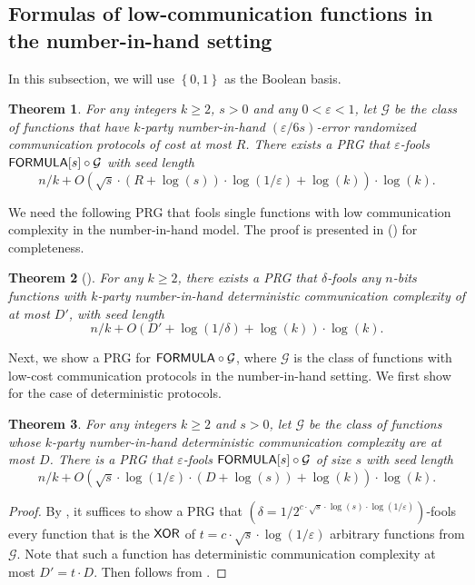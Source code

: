 \documentclass[10pt,a4paper]{article}
\newtheorem{theorem}{Theorem}
\newcommand{\bool}{\left\{0,1\right\}}
\newcommand{\FORMULA}{{\sf FORMULA}}
\newcommand{\XOR}{{\sf XOR}}
\begin{document}
    \subsection{Formulas of low-communication functions in the number-in-hand setting}
    
    In this subsection, we will use $\bool$ as the Boolean basis.
    
	\begin{theorem}\label{thm:prg-formula-lc}
		For any integers $k\geq 2$, $s>0$ and any $0<\varepsilon<1$, let $\mathcal{G}$ be the class of functions that have $k$-party number-in-hand $(\varepsilon/6s)$-error randomized communication protocols of cost at most $R$. There exists a PRG that $\varepsilon$-fools $\FORMULA[s]\circ \mathcal{G}$ with seed length
		\[
			n/k+O\left(\sqrt{s}\cdot (R +\log (s))\cdot \log(1/\varepsilon) +\log(k)\right)\cdot\log(k).
		\]
	\end{theorem}
    
    We need the following PRG that fools single functions with low communication complexity in the number-in-hand model. The proof is presented in  () for completeness.

	\begin{theorem}[\cite{ASWZ96,INW94}]\label{thm:prg-lc}
		For any $k\geq 2$, there exists a PRG that $\delta$-fools any $n$-bits functions with $k$-party number-in-hand deterministic communication complexity of at most $D'$, with seed length
		\[
			n/k+O\left(D' + \log(1/\delta)+\log(k)\right)\cdot\log(k).
		\]
	\end{theorem}

    Next, we show a PRG for $\FORMULA\circ\mathcal{G}$, where $\mathcal{G}$ is the class of functions with low-cost communication protocols in the number-in-hand setting. We first show for the case of deterministic protocols.
    
    \begin{theorem}\label{thm:prg-formula-lc-det}
		For any integers $k\geq 2$ and $s>0$, let $\mathcal{G}$ be the class of functions whose $k$-party number-in-hand deterministic communication complexity are at most $D$. There is a PRG that $\varepsilon$-fools $\FORMULA[s]\circ \mathcal{G}$ of size $s$ with seed length
		\[
			n/k+O\left(\sqrt{s}\cdot \log(1/\varepsilon)\cdot (D +\log (s)) +\log(k)\right)\cdot\log(k).
		\]
	\end{theorem}
	
	\begin{proof}
		By , it suffices to show a PRG that $\left(\delta=1/2^{c\cdot\sqrt{s}\cdot\log (s)\cdot \log(1/\varepsilon)}\right)$-fools every function that is the $\XOR$ of $t=c\cdot\sqrt{s}\cdot \log(1/\varepsilon)$ arbitrary functions from $\mathcal{G}$. Note that such a function has deterministic communication complexity at most $D'=t\cdot D$. Then  follows from .
	\end{proof}
	
\end{document}
